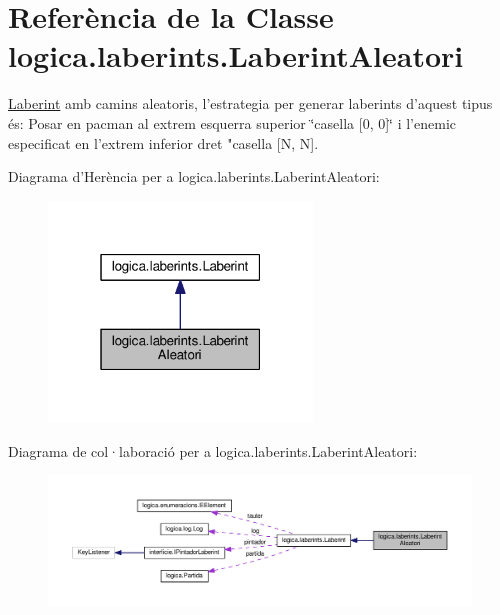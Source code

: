 \hypertarget{classlogica_1_1laberints_1_1_laberint_aleatori}{\section{Referència de la Classe logica.\+laberints.\+Laberint\+Aleatori}
\label{classlogica_1_1laberints_1_1_laberint_aleatori}
}


\hyperlink{classlogica_1_1laberints_1_1_laberint}{Laberint} amb camins aleatoris, l'estrategia per generar laberints d'aquest tipus és\+: Posar en pacman al extrem esquerra superior \char`\"{}casella \mbox{[}0, 0\mbox{]}\char`\"{} i l'enemic especificat en l'extrem inferior dret "casella \mbox{[}N, N\mbox{]}.  




Diagrama d'Herència per a logica.\+laberints.\+Laberint\+Aleatori\+:\nopagebreak
\begin{figure}[H]
\begin{center}
\leavevmode
\includegraphics[width=199pt]{classlogica_1_1laberints_1_1_laberint_aleatori__inherit__graph}
\end{center}
\end{figure}


Diagrama de col·laboració per a logica.\+laberints.\+Laberint\+Aleatori\+:\nopagebreak
\begin{figure}[H]
\begin{center}
\leavevmode
\includegraphics[width=350pt]{classlogica_1_1laberints_1_1_laberint_aleatori__coll__graph}
\end{center}
\end{figure}
